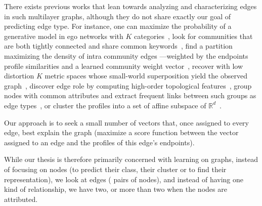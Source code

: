 There exists previous works that lean towards analyzing and characterizing edges in such multilayer
graphs, although they do not share exactly our goal of predicting edge type. For instance, one can
maximize the probability of a generative model in ego networks with $K$
categories~\autocites{LeskovecEgo12}{LeskovecEgo14}, look for communities that are both tightly
connected and share common keywords~\autocite{AttributedCommunity16}, find a partition maximizing
the density of intra community edges ---weighted by the endpoints profile similarities and a learned
community weight vector~\autocite{ZhangModelFree16}, recover with low distortion $K$ metric spaces
whose small-world superposition yield the observed graph~\autocite{Abraham2012a}, discover edge role
by computing high-order topological features~\autocite{ahmed2017roles}, group nodes with common
attributes and extract frequent links between such groups as edge types~\autocite{conceptualLinks12},
or cluster the profiles into a set of affine subspace of $\mathbb{R}^d$~\autocite{SCSurvey11}.

Our approach is to seek a small number of vectors that, once assigned to every edge, best explain
the graph (\ie maximize a score function between the vector assigned to an edge  and the profiles of
this edge's endpoints).
\iffalse
From this initial formulation, we derive two optimization problems, and initially solve them on
synthetic data, generated with a few natural topological constraints. We compared these solutions
with the result of a baseline approach that simply clusters the pairwise profile vectors using
$k$-means. As showed on \autoref{fig:edge}, on a graph with \np{500} nodes, \np{1300} edges and 7
types of edges (where each node is involved in at most 3 types of relation), we recover the hidden
edge assignment more accurately than the $k$-means baseline.

\begin{figure}[htpb]
  \centering
  \texttt{[image: assets/raw/Gfixed\_over0\_step2\_7dirs3\_ambi.pdf]}
  \caption{Distribution of the Adjusted Mutual Information (the closer to $1$ the better) over
  \np{600} generations of 7 random directions, comparing our \textsf{optim} method with the $k$-means
baseline. \label{fig:edge}}
\end{figure}
\fi

While our thesis is therefore primarily concerned with learning on graphs, instead of focusing on
nodes (to predict their class, their cluster or to find their representation), we look at edges (\ie
pairs of nodes), and instead of having one kind of relationship, we have two, or more than two when
the nodes are attributed.
